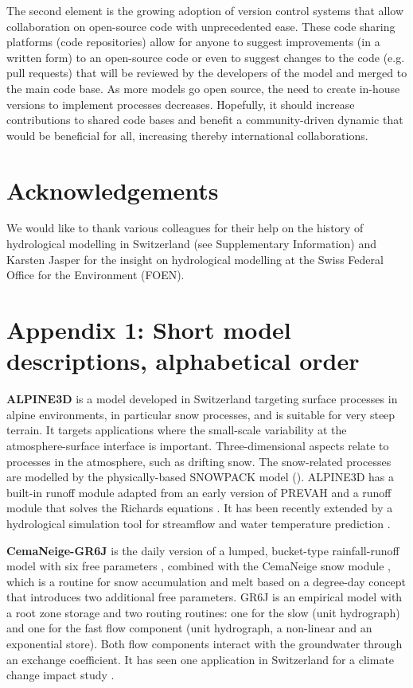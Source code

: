 \documentclass[10pt,a4paper]{article}
\begin{document}
The second element is the growing adoption of version control systems that allow collaboration on open-source code with unprecedented ease. These code sharing platforms (code repositories) allow for anyone to suggest improvements (in a written form) to an open-source code or even to suggest changes to the code (e.g. pull requests) that will be reviewed by the developers of the model and merged to the main code base. As more models go open source, the need to create in-house versions to implement processes decreases. Hopefully, it should increase contributions to shared code bases and benefit a community-driven dynamic that would be beneficial for all, increasing thereby international collaborations.


\section*{Acknowledgements}

We would like to thank various colleagues for their help on the history of hydrological modelling in Switzerland (see Supplementary Information) and Karsten Jasper for the insight on hydrological modelling at the Swiss Federal Office for the Environment (FOEN).


\section*{Appendix 1: Short model descriptions, alphabetical order}
\label{appendix:1}

\textbf{ALPINE3D} \citep{Lehning_2006} is a model developed in Switzerland targeting surface processes in alpine environments, in particular snow processes, and is suitable for very steep terrain. It targets applications where the small-scale variability at the atmosphere-surface interface is important. Three-dimensional aspects relate to processes in the atmosphere, such as drifting snow. The snow-related processes are modelled by the physically-based SNOWPACK model (\citealt{Lehning2002,Bartelt_2002,Bartelt2002,Lehning_2002}). ALPINE3D has a built-in runoff module adapted from an early version of PREVAH \citep{Lehning_2006} and a runoff module that solves the Richards equations \citep{Wever2017}. It has been recently extended by a hydrological simulation tool for streamflow and water temperature prediction \citep{Gallice_2016}.

\textbf{CemaNeige-GR6J} is the daily version of a lumped, bucket-type rainfall-runoff model with six free parameters \citep{Pushpalatha2011}, combined with the CemaNeige snow module \citep{Valery2014a,Valery2014b}, which is a routine for snow accumulation and melt based on a degree-day concept that introduces two additional free parameters. GR6J is an empirical model with a root zone storage and two routing routines: one for the slow (unit hydrograph) and one for the fast flow component ({unit hydrograph}, a non-linear and an exponential store). Both flow components interact with the groundwater through an exchange coefficient. It has seen one application in Switzerland for a climate change impact study \citep{Keller2019a}.
\end{document}
